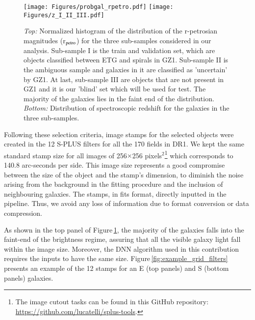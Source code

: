 \documentclass[fleqn,usenatbib]{mnras}
\begin{document}
 

\begin{figure}
	\centering
	\texttt{[image: Figures/probgal\_rpetro.pdf]}
	\texttt{[image: Figures/z\_I\_II\_III.pdf]}
	\caption{{\it Top:} Normalized histogram of the distribution of the r-petrosian magnitudes (r$_{\rm petro}$) for the three sub-samples considered in our analysis. Sub-sample I is the train and validation set, which are objects classified between ETG and spirals in GZ1. Sub-sample II is the ambiguous sample and galaxies in it are classified as 'uncertain' by GZ1. At last, sub-sample III are objects that are not present in GZ1 and it is our 'blind' set which will be used for test.
    The majority of the galaxies lies in the faint end of the distribution. 
	{\it Bottom:} Distribution of spectroscopic redshift \citep{Molino2020} for the galaxies in the three sub-samples.}
	\label{fig:histsamplesrpetro}
\end{figure}




Following these selection criteria, image stamps for the selected objects were created in the 12 S-PLUS filters for all the 170 fields in DR1. We kept the same standard stamp size for all images of 256$\times$256 pixels$^2$\footnote{The image cutout tasks can be found in this GitHub repository: \href{https://github.com/lucatelli/splus-tools}{https://github.com/lucatelli/splus-tools}.} which corresponds to 140.8 arc-seconds per side. This image size represents a good compromise between the size of the object and the stamp's dimension, to diminish the noise arising from the background in the fitting procedure and the inclusion of neighbouring galaxies. The stamps, in fits format, directly inputted in the pipeline. Thus, we avoid any loss of information due to format conversion or data compression.   

As shown in the top panel of Figure\,\ref{fig:histsamplesrpetro}, the majority of the galaxies falls into the faint-end of the brightness regime, assuring that all the visible galaxy light fall within the image size.
Moreover, the DNN algorithm used in this contribution requires the inputs to have the same size. 
Figure\,\ref{fig:example_grid_filters} presents an example of the 12 stamps for an E (top panels) and S (bottom panels) galaxies.
\end{document}
